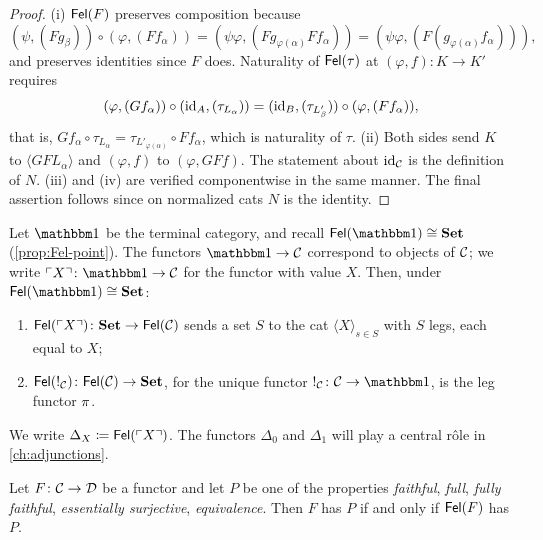 \begin{proof}
(i) $\mathsf{Fel}(F)$ preserves composition because
\[
(\psi,(Fg_\beta))\circ(\varphi,(Ff_\alpha))=(\psi\varphi,(Fg_{\varphi(\alpha)}Ff_\alpha))=(\psi\varphi,(F(g_{\varphi(\alpha)}f_\alpha))),
\]
and preserves identities since $F$ does. Naturality of $\mathsf{Fel}(\tau)$ at
$(\varphi,f)\colon K\to K'$ requires
\[
(\varphi,(Gf_\alpha))\circ(\mathrm{id}_A,(\tau_{L_\alpha}))=(\mathrm{id}_B,(\tau_{L'_\beta}))\circ(\varphi,(Ff_\alpha)),
\]
that is, $Gf_\alpha\circ\tau_{L_\alpha}=\tau_{L'_{\varphi(\alpha)}}\circ Ff_\alpha$,
which is naturality of $\tau$.
(ii) Both sides send $K$ to $\langle GFL_\alpha\rangle$ and $(\varphi,f)$ to
$(\varphi,GFf)$. The statement about $\mathrm{id}_{\mathcal{C}}$ is the definition of $N$.
(iii) and (iv) are verified componentwise in the same manner.
The final assertion follows since on normalized cats $N$ is the identity.
\end{proof}

\begin{example}\label{ex:Fel-of-point}
Let $\one$ be the terminal category, and recall $\Fel(\one)\iso\Set$
(\cref{prop:Fel-point}). The functors $\one\to\cC$ correspond to objects of
$\mathcal{C}$; we write $\ulcorner X\urcorner\colon\one\to\cC$ for the functor with value
$X$. Then, under $\Fel(\one)\iso\Set$:
\begin{enumerate}
\item $\mathsf{Fel}(\ulcorner X\urcorner)\colon\mathbf{Set}\to\mathsf{Fel}(\mathcal{C})$ sends a set $S$ to
  the cat $\langle X\rangle_{s\in S}$ with $S$ legs, each equal to $X$;
\item $\mathsf{Fel}(!_{\mathcal{C}})\colon\mathsf{Fel}(\mathcal{C})\to\mathbf{Set}$, for the unique functor
  $!_\cC\colon\cC\to\one$, is the leg functor $\pi$.
\end{enumerate}
We write $\Delta_X\coloneqq\mathsf{Fel}(\ulcorner X\urcorner)$. The functors
$\Delta_0$ and $\Delta_1$ will play a central r\^ole in \cref{ch:adjunctions}.
\end{example}

\begin{proposition}\label{prop:Fel-properties}
Let $F\colon\mathcal{C}\to\mathcal{D}$ be a functor and let $P$ be one of the properties
\emph{faithful}, \emph{full}, \emph{fully faithful}, \emph{essentially
surjective}, \emph{equivalence}. Then $F$ has $P$ if and only if $\mathsf{Fel}(F)$
has $P$.
\end{proposition}

